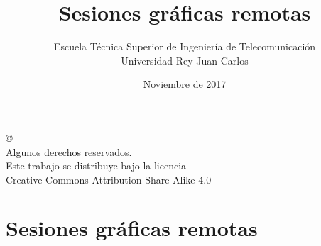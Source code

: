 \documentclass[ucs]{beamer}
\begin{document}
\title[Sesiones gráficas remotas]{Sesiones gráficas remotas }
\author[GSyC]{Escuela Técnica Superior de Ingeniería de Telecomunicación\\
Universidad Rey Juan Carlos}
\date[2017]{Noviembre de 2017}




\begin{frame}
  \titlepage
\end{frame}



\begin{frame}[b]
\begin{flushright}
{\tiny
\copyright \insertshortdate~\insertshortauthor \\
  Algunos derechos reservados. \\
  Este trabajo se distribuye bajo la licencia \\
  Creative Commons Attribution Share-Alike 4.0\\
}
\end{flushright}  
\end{frame}








\section{Sesiones gráficas remotas}
\end{document}
